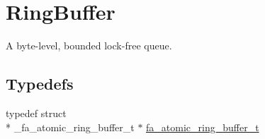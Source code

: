 \hypertarget{group___fa_atomic_ring_buffer}{\section{Ring\-Buffer}
\label{group___fa_atomic_ring_buffer}
}


A byte-\/level, bounded lock-\/free queue.  


\subsection*{Typedefs}
\begin{DoxyCompactItemize}
\item 
typedef struct \\*
\-\_\-fa\-\_\-atomic\-\_\-ring\-\_\-buffer\-\_\-t $\ast$ \hyperlink{group___fa_atomic_ring_buffer_ga3482421740e66f489d94407a0d48a2d0}{fa\-\_\-atomic\-\_\-ring\-\_\-buffer\-\_\-t}
\end{DoxyCompactItemize}
